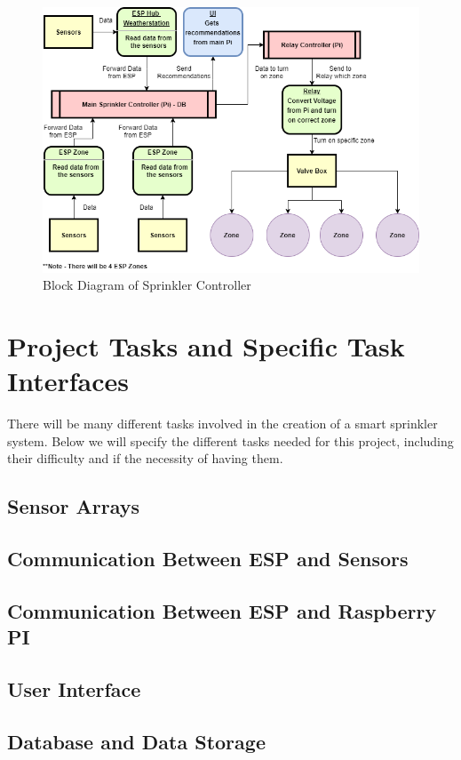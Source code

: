 \documentclass[letterpaper, 10 pt, conference]{ieeeconf}  %
\begin{document}
\begin{figure}[H]
\includegraphics[scale=.4]{Diagram.png}
\caption{Block Diagram of Sprinkler Controller}
\end{figure}

\section{Project Tasks and Specific Task Interfaces}
There will be many different tasks involved in the creation of a smart sprinkler system. Below we will specify the different tasks needed for this project, including their difficulty and if the necessity of having them.

\subsection{Sensor Arrays}

\subsection{Communication Between ESP and Sensors}

\subsection{Communication Between ESP and Raspberry PI}

\subsection{User Interface}

\subsection{Database and Data Storage}
\end{document}
